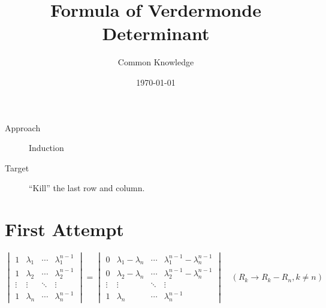 \documentclass[a4paper]{article}
\title{Formula of Verdermonde Determinant}
\author{Common Knowledge}
\date{\today}
\begin{document}
\maketitle

\begin{description}
  \item[Approach] Induction
  \item[Target] ``Kill'' the last row and column.
\end{description}

\section{First Attempt}
\begin{equation*}
\begin{vmatrix}
1&\lambda_1 & \cdots & \lambda_1^{n - 1} \\
1&\lambda_2 & \cdots & \lambda_2^{n - 1} \\
\vdots  & \vdots & \ddots & \vdots \\
1&\lambda_n & \cdots & \lambda_n^{n - 1}
\end{vmatrix}
=
\begin{vmatrix}
0&\lambda_1 - \lambda_n & \cdots & \lambda_1^{n - 1} - \lambda_n^{n - 1} \\
0&\lambda_2 - \lambda_n & \cdots & \lambda_2^{n - 1} - \lambda_n^{n - 1} \\
\vdots  & \vdots & \ddots & \vdots \\
1&\lambda_n & \cdots & \lambda_n^{n-1}
\end{vmatrix} \quad (R_k \rightarrow R_k - R_n, k \neq n)
\end{equation*}
\end{document}

